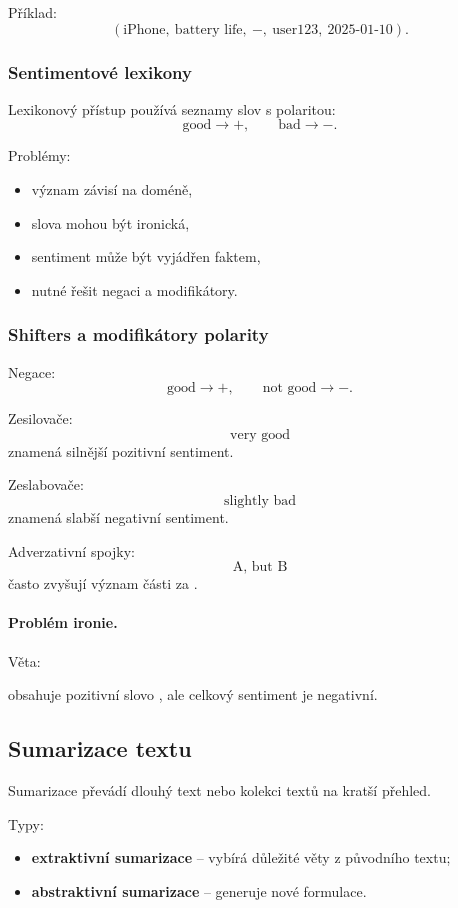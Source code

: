 Příklad:
\[
(\text{iPhone},\ \text{battery life},\ -,\ \text{user123},\ \text{2025-01-10}).
\]

\subsubsection{Sentimentové lexikony}

Lexikonový přístup používá seznamy slov s polaritou:
\[
\text{good} \rightarrow +,
\qquad
\text{bad} \rightarrow -.
\]

Problémy:
\begin{itemize}
    \item význam závisí na doméně,
    \item slova mohou být ironická,
    \item sentiment může být vyjádřen faktem,
    \item nutné řešit negaci a modifikátory.
\end{itemize}

\subsubsection{Shifters a modifikátory polarity}

Negace:
\[
\text{good}
\rightarrow +,
\qquad
\text{not good}
\rightarrow -.
\]

Zesilovače:
\[
\text{very good}
\]
znamená silnější pozitivní sentiment.

Zeslabovače:
\[
\text{slightly bad}
\]
znamená slabší negativní sentiment.

Adverzativní spojky:
\[
\text{A, but B}
\]
často zvyšují význam části za .

\paragraph{Problém ironie.}
Věta:
\begin{quote}
\end{quote}
obsahuje pozitivní slovo , ale celkový sentiment je negativní.

\subsection{Sumarizace textu}

Sumarizace převádí dlouhý text nebo kolekci textů na kratší přehled.

Typy:
\begin{itemize}
    \item \textbf{extraktivní sumarizace} -- vybírá důležité věty z původního textu;
    \item \textbf{abstraktivní sumarizace} -- generuje nové formulace.
\end{itemize}

